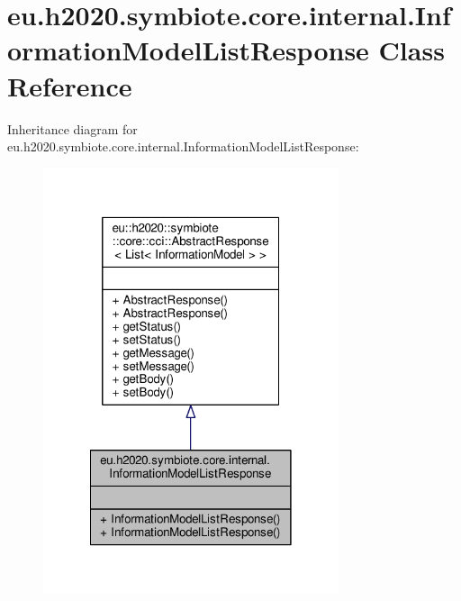 \hypertarget{classeu_1_1h2020_1_1symbiote_1_1core_1_1internal_1_1InformationModelListResponse}{}\section{eu.\+h2020.\+symbiote.\+core.\+internal.\+Information\+Model\+List\+Response Class Reference}
\label{classeu_1_1h2020_1_1symbiote_1_1core_1_1internal_1_1InformationModelListResponse}


Inheritance diagram for eu.\+h2020.\+symbiote.\+core.\+internal.\+Information\+Model\+List\+Response\+:\nopagebreak
\begin{figure}[H]
\begin{center}
\leavevmode
\includegraphics[width=246pt]{classeu_1_1h2020_1_1symbiote_1_1core_1_1internal_1_1InformationModelListResponse__inherit__graph}
\end{center}
\end{figure}



